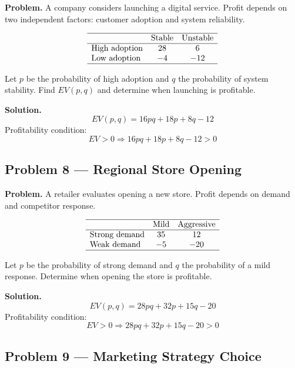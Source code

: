 \begin{ExamProblems}
		\textbf{Problem.}
		A company considers launching a digital service. Profit depends on two independent factors:
		customer adoption and system reliability.
		
		\[
		\begin{array}{lcc}
		\hline
		 & \text{Stable} & \text{Unstable} \\
		\hline
		\text{High adoption} & 28 & 6 \\
		\text{Low adoption} & -4 & -12 \\
		\hline
		\end{array}
		\]
		
		Let \(p\) be the probability of high adoption and \(q\) the probability of system stability.  
		Find \(EV(p,q)\) and determine when launching is profitable.
		
		\textbf{Solution.}
		\[
		EV(p,q)=16pq+18p+8q-12
		\]
		Profitability condition:
		\[
		EV>0 \Rightarrow 16pq+18p+8q-12>0
		\]
		
		\hypertarget{c7-ex8}{}
		\item
		\subsection*{Problem 8 — Regional Store Opening}
		
		\textbf{Problem.}
		A retailer evaluates opening a new store. Profit depends on demand and competitor response.
		
		\[
		\begin{array}{lcc}
		\hline
		 & \text{Mild} & \text{Aggressive} \\
		\hline
		\text{Strong demand} & 35 & 12 \\
		\text{Weak demand} & -5 & -20 \\
		\hline
		\end{array}
		\]
		
		Let \(p\) be the probability of strong demand and \(q\) the probability of a mild response.  
		Determine when opening the store is profitable.
		
		\textbf{Solution.}
		\[
		EV(p,q)=28pq+32p+15q-20
		\]
		Profitability condition:
		\[
		EV>0 \Rightarrow 28pq+32p+15q-20>0
		\]
		
		\hypertarget{c7-ex9}{}
		\item
		\subsection*{Problem 9 — Marketing Strategy Choice}
		

\end{ExamProblems}
